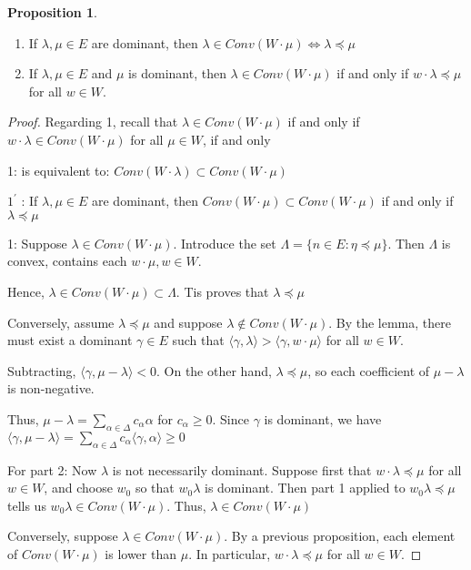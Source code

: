 \documentclass{article}
\theoremstyle{definition}
\newtheorem{proposition}{Proposition}
\begin{document}
\begin{proposition}
    \begin{enumerate}
        \item If \(\lambda ,\mu \in E\) are dominant, then \(\lambda \in Conv(W\cdot \mu) \iff \lambda \preceq \mu\) 
        \item If \(\lambda ,\mu \in E\) and \(\mu\) is dominant, then \(\lambda \in Conv(W\cdot \mu)\) if and only if \(w\cdot \lambda \preceq \mu\) for all \(w\in W\). 
    \end{enumerate}
\end{proposition}

\begin{proof}

    Regarding 1, recall that \(\lambda \in Conv(W\cdot \mu)\) if and only if \(w\cdot \lambda \in Conv(W\cdot \mu)\) for all \(\mu \in W\), if and only 

    1: is equivalent to: \(Conv(W\cdot \lambda ) \subset Conv(W\cdot \mu)\) 

    \(1^{\prime} \) : If \(\lambda ,\mu \in E\) are dominant, then \(Conv(W\cdot \mu ) \subset Conv (W\cdot \mu )\) if and only if \(\lambda \preceq \mu \)  

    1: Suppose \(\lambda \in Conv(W\cdot \mu)\). Introduce the set \(\Lambda = \{ n\in E : \eta \preceq \mu \} \). Then \(\Lambda \) is convex, contains each \(w\cdot \mu , w\in W\).

    Hence, \(\lambda \in Conv(W\cdot \mu) \subset \Lambda\). Tis proves that \(\lambda \preceq \mu\) 
    
    Conversely, assume \(\lambda \preceq \mu\) and suppose \(\lambda\notin Conv(W\cdot \mu)\). By the lemma, there must exist a dominant \(\gamma \in E\) such that \(\langle \gamma ,\lambda  \rangle > \langle \gamma , w\cdot \mu \rangle \) for all \(w\in W\).

    Subtracting, \(\langle \gamma , \mu - \lambda \rangle < 0\). On the other hand, \(\lambda \preceq \mu\), so each coefficient of \(\mu - \lambda\) is non-negative.

    Thus, \(\mu - \lambda = \sum_{\alpha \in \Delta }^{} c_\alpha \alpha \) for \(c_\alpha \geq 0\). Since \(\gamma\) is dominant, we have \(\langle \gamma , \mu - \lambda  \rangle = \sum_{\alpha \in \Delta }^{} c_\alpha \langle \gamma , \alpha  \rangle \geq 0\)

    For part 2: Now \(\lambda\) is not necessarily dominant. Suppose first that \(w\cdot \lambda \preceq \mu \) for all \(w \in W\), and choose \(w_0\) so that \(w_0 \lambda \) is dominant. Then part 1 applied to \(w_0 \lambda \preceq \mu\) tells us \(w_0 \lambda \in Conv(W\cdot \mu)\). Thus, \(\lambda \in Conv(W\cdot \mu)\) 
    
    Conversely, suppose \(\lambda \in Conv(W\cdot \mu )\). By a previous proposition, each element of \(Conv(W\cdot \mu)\) is lower than \(\mu\). In particular, \(w\cdot \lambda \preceq \mu \) for all \(w\in W\).

\end{proof}
\end{document}
